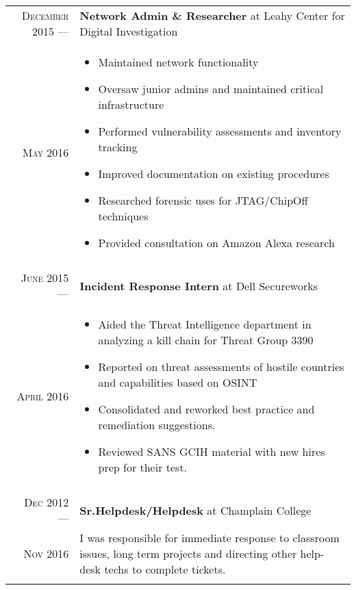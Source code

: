 \documentclass[a4paper,10pt]{article}
\begin{document}
\begin{tabular}{r|p{11cm}}
 \textsc{December 2015} ---            & \textbf {Network Admin \& Researcher} at Leahy Center for Digital Investigation \\
 \textsc{May 2016} \hphantom{---} & \footnotesize{
        \vspace{-2mm}
         \begin{itemize}[leftmargin=*]
            \item Maintained network functionality
            \item Oversaw junior admins and maintained critical infrastructure 
            \item Performed vulnerability assessments and inventory tracking
            \item Improved documentation on existing procedures
            \item Researched forensic uses for JTAG/ChipOff techniques
            \item Provided consultation on Amazon Alexa research
        \end{itemize}
        \vspace*{-\baselineskip}
    }\\
\multicolumn{2}{c}{} \\

 \textsc{June 2015} ---            & \textbf{Incident Response Intern} at Dell Secureworks\\
 \textsc{April 2016} \hphantom{---} & \footnotesize{
         \vspace{-2mm}
         \begin{itemize}[leftmargin=*]
            \item Aided the Threat Intelligence department in analyzing a kill chain for Threat Group 3390
            \item Reported on threat assessments of hostile countries and capabilities based on OSINT
            \item Consolidated and reworked best practice and remediation suggestions.
            \item Reviewed SANS GCIH material with new hires prep for their test.
        \end{itemize}
        \vspace*{-\baselineskip}
    }\\
\multicolumn{2}{c}{} \\

\textsc{Dec 2012} ---            & \textbf{Sr.Helpdesk/Helpdesk} at Champlain College\\
\textsc{Nov 2016} \hphantom{---} & \footnotesize{ I was responsible for immediate response to classroom issues, long term projects and directing other help-desk techs to complete tickets.
         \vspace{-2mm}
        \vspace*{-\baselineskip}
    }\\
\multicolumn{2}{c}{}  \\


\end{tabular}
\end{document}
